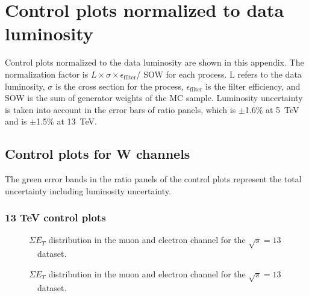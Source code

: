 \section{Control plots normalized to data luminosity}
\label{sec:nonnormCP}

	Control plots normalized to the data luminosity are shown in this appendix.
	The normalization factor is $L \times \sigma \times \epsilon_\mathrm{filter}$/ SOW for each process. L refers to the data luminosity, $\sigma$ is the cross section for the process, $\epsilon_\mathrm{filter}$ is the filter efficiency, and SOW is the sum of generator weights of the MC sample.
	Luminosity uncertainty is taken into account in the error bars of ratio panels, which is $\pm$1.6\% at 5~TeV and is $\pm$1.5\% at 13~TeV.

\subsection{Control plots for W channels}
\label{ssec:nonnormCP_W}
The green error bands in the ratio panels of the control plots represent the total uncertainty including luminosity uncertainty.
\subsubsection{13 TeV control plots}
\label {sssec:nonnormCP_W13TeV}
\begin{figure}[h]
\centering
{}

\caption{$\Sigma \bar{E_T}$ distribution in the muon and electron channel  for the $\sqrt{s} = 13$~\TeV\ dataset.}\end{figure}
%

\begin{figure}[h]
\centering
{}

\caption{$\Sigma{E_T}$ distribution in the muon and electron channel  for the $\sqrt{s} = 13$~\TeV\ dataset.}\end{figure}



